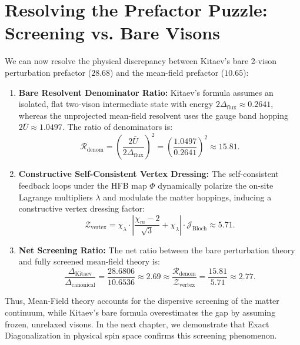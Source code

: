 \section{Resolving the Prefactor Puzzle: Screening vs. Bare Visons}
\label{sec:phase4_prefactor_resolution}

We can now resolve the physical discrepancy between Kitaev's bare 2-vison perturbation prefactor ($28.68$) and the mean-field prefactor ($10.65$):
\begin{enumerate}
    \item \textbf{Bare Resolvent Denominator Ratio:} Kitaev's formula assumes an isolated, flat two-vison intermediate state with energy $2\Delta_{\mathrm{flux}} \approx 0.2641$, whereas the unprojected mean-field resolvent uses the gauge band hopping $2\bar{U} \approx 1.0497$. The ratio of denominators is:
    \begin{equation}
    \mathcal{R}_{\mathrm{denom}} = \left( \frac{2\bar{U}}{2\Delta_{\mathrm{flux}}} \right)^2 = \left( \frac{1.0497}{0.2641} \right)^2 \approx \mathbf{15.81}.
    \end{equation}
    \item \textbf{Constructive Self-Consistent Vertex Dressing:} The self-consistent feedback loops under the HFB map $\Phi$ dynamically polarize the on-site Lagrange multipliers $\lambda$ and modulate the matter hoppings, inducing a constructive vertex dressing factor:
    \begin{equation}
    \mathcal{Z}_{\mathrm{vertex}} = \chi_\lambda \cdot \left| \frac{\chi_m - 2}{\sqrt{3}} + \chi_\lambda \right| \cdot \mathcal{J}_{\mathrm{Bloch}} \approx \mathbf{5.71}.
    \end{equation}
    \item \textbf{Net Screening Ratio:} The net ratio between the bare perturbation theory and fully screened mean-field theory is:
    \begin{equation}
    \frac{\Delta_{\mathrm{Kitaev}}}{\Delta_{\mathrm{canonical}}} = \frac{28.6806}{10.6536} \approx \mathbf{2.69} \approx \frac{\mathcal{R}_{\mathrm{denom}}}{\mathcal{Z}_{\mathrm{vertex}}} = \frac{15.81}{5.71} \approx 2.77.
    \end{equation}
\end{enumerate}

Thus, Mean-Field theory accounts for the dispersive screening of the matter continuum, while Kitaev's bare formula overestimates the gap by assuming frozen, unrelaxed visons. In the next chapter, we demonstrate that Exact Diagonalization in physical spin space confirms this screening phenomenon.
